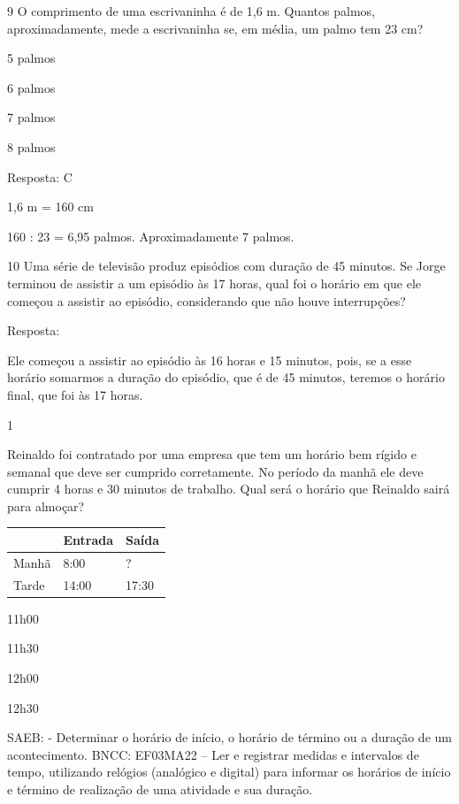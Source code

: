 \num{9} O comprimento de uma escrivaninha é de 1,6 m. Quantos palmos,
aproximadamente, mede a escrivaninha se, em média, um palmo tem 23 cm?

\begin{escolha}

\item
  5 palmos
\item
  6 palmos
\item
  7 palmos
\item
  8 palmos
\end{escolha}

Resposta: C

1,6 m = 160 cm

160 : 23 = 6,95 palmos. Aproximadamente 7 palmos.

\num{10} Uma série de televisão produz episódios com duração de 45 minutos.
Se Jorge terminou de assistir a um episódio às 17 horas, qual foi o
horário em que ele começou a assistir ao episódio, considerando que não houve interrupções?


Resposta:

Ele começou a assistir ao episódio às 16 horas e 15 minutos, pois, se a esse
horário somarmos a duração do episódio, que é de 45 minutos, teremos o
horário final, que foi às 17 horas.


\num{1}

Reinaldo foi contratado por uma empresa que tem um horário bem rígido
e semanal que deve ser cumprido corretamente. No período da manhã ele deve
cumprir 4 horas e 30 minutos de trabalho. Qual será o horário que
Reinaldo sairá para almoçar?

\begin{longtable}[]{@{}lll@{}}
\toprule
& Entrada & Saída\tabularnewline
\midrule
\endhead
Manhã & 8:00 & ?\tabularnewline
Tarde & 14:00 & 17:30\tabularnewline
\bottomrule
\end{longtable}

\begin{escolha}
\item
  11h00
\item
  11h30
\item
  12h00
\item
  12h30
\end{escolha}

SAEB: - Determinar o horário de início, o horário de término ou a duração de um acontecimento. 
BNCC: EF03MA22 -- Ler e registrar medidas e intervalos de tempo, utilizando relógios (analógico e
digital) para informar os horários de início e término de realização de uma atividade e sua
duração.

